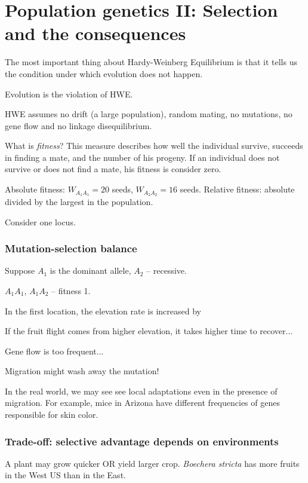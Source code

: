 \documentclass[main.tex]{subfiles}
\begin{document}
\section{Population genetics II: Selection and the consequences}

The most important thing about Hardy-Weinberg Equilibrium is that it tells us the condition under which evolution does not happen.

Evolution is the violation of HWE.

HWE assumes no drift (a large population), random mating, no mutations, no gene flow and no linkage disequilibrium.

What is \emph{fitness}?
This measure describes how well the individual survive, succeeds in finding a mate, and the number of his progeny.
If an individual does not survive or does not find a mate, his fitness is consider zero.

Absolute fitness: $ W_{A_1 A_1} = 20 $ seeds, $ W_{A_2 A_2} = 16 $ seeds.
Relative fitness: absolute divided by the largest in the population.

Consider one locus.


\subsubsection{Mutation-selection balance}

Suppose $ A_1 $ is the dominant allele, $ A_2 $ -- recessive.

$ A_1 A_1 $, $ A_1 A_2 $ -- fitness 1.


In the first location, the elevation rate is increased by

If the fruit flight comes from higher elevation, it takes higher time to recover...

Gene flow is too frequent...

Migration might wash away the mutation!

In the real world, we may see see local adaptations even in the presence of migration.
For example, mice in Arizona have different frequencies of genes responsible for skin color.

\subsubsection{Trade-off: selective advantage depends on environments}

A plant may grow quicker OR yield larger crop.
\emph{Boechera stricta} has more fruits in the West US than in the East.
\end{document}
